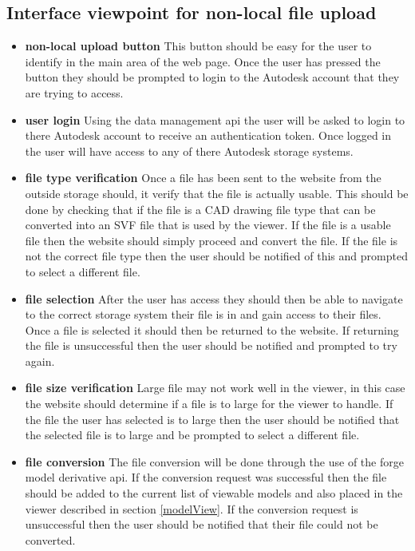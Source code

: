 \documentclass[letterpaper, 10pt, draftclsnofoot, compsoc, onecolumn]{IEEEtran}
\begin{document}
\subsection{Interface viewpoint for non-local file upload}
\begin{itemize}
	\item[]\textbf{non-local upload button} This button should be easy for the user to identify in the main area of the web page. Once the user has pressed the button they should be prompted to login to the Autodesk account that they are trying to access.
	\item[]\textbf{user login} Using the data management api the user will be asked to login to there Autodesk account to receive an authentication token. Once logged in the user will have access to any of there Autodesk storage systems. 
	\item[]\textbf{file type verification} Once a file has been sent to the website from the outside storage should, it verify that the file is actually usable. This should be done by checking that if the file is a CAD drawing file type that can be converted into an SVF file that is used by the viewer. If the file is a usable file then the 	
	website should simply proceed and convert the file. If the file is not the correct file type then the user should be notified of this and prompted to select a different file.  
	\item[]\textbf{file selection} After the user has access they should then be able to navigate to the correct storage system their file is in and gain access to their files. Once a file is selected it should then be returned to the website. If returning the file is unsuccessful then the user should be notified and prompted to try 
	again.
	\item[]\textbf{file size verification} Large file may not work well in the viewer, in this case the website should determine if a file is to large for the viewer to handle. If the file the user has selected is to large then the user should be 		
	notified that the selected file is to large and be prompted to select a different file.
	\item[]\textbf{file conversion} The file conversion will be done through the use of the forge model derivative api. If the conversion request was successful then the file should be added to the current list of viewable models and also placed in the viewer described in section \ref{modelView}. If the conversion request is unsuccessful then the user should
	 be notified that their file could not be converted. 
\end{itemize}
\end{document}
